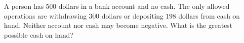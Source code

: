 A person has $500$ dollars in a bank account and no cash. The only allowed operations are withdrawing $300$ dollars or depositing $198$ dollars from cash on hand. Neither account nor cash may become negative. What is the greatest possible cash on hand?
